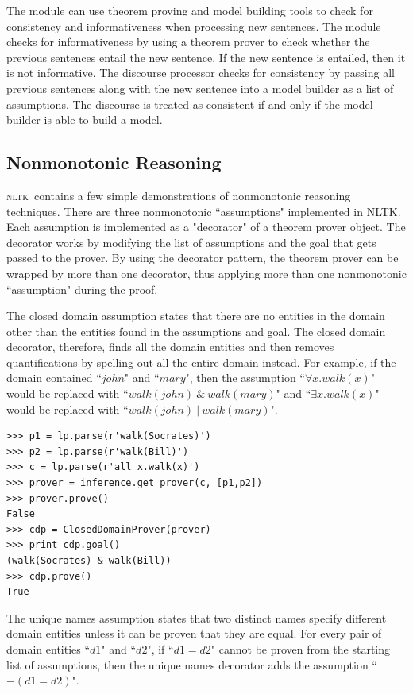 \documentclass[11pt,a4paper]{article}
\newcommand{\NLTK}{\textsc{nltk}}
\begin{document}
The module can use theorem proving and model building tools to check for consistency and informativeness when processing new sentences.  The module checks for informativeness by using a theorem prover to check whether the previous sentences entail the new sentence.  If the new sentence is entailed, then it is not informative.  The discourse processor checks for consistency by passing all previous sentences along with the new sentence into a model builder as a list of assumptions.  The discourse is treated as consistent if and only if the model builder is able to build a model.

\subsection{Nonmonotonic Reasoning}
\NLTK\ contains a few simple demonstrations of nonmonotonic reasoning techniques.  There are three nonmonotonic ``assumptions" implemented in NLTK.  Each assumption is implemented as a "decorator" of a theorem prover object.  The decorator works by modifying the list of assumptions and the goal that gets passed to the prover.  By using the decorator pattern, the theorem prover can be wrapped by more than one decorator, thus applying more than one nonmonotonic ``assumption" during the proof.

The closed domain assumption states that there are no entities in the domain other than the entities found in the assumptions and goal.  The closed domain decorator, therefore, finds all the domain entities and then removes quantifications by spelling out all the entire domain instead.  For example, if the domain contained ``$john$" and ``$mary$", then the assumption ``$\forall x.walk(x)$" would be replaced with ``$walk(john)~\&~walk(mary)$" and ``$\exists x.walk(x)$" would be replaced with ``$walk(john)~|~walk(mary)$".

\begin{verbatim}
>>> p1 = lp.parse(r'walk(Socrates)')
>>> p2 = lp.parse(r'walk(Bill)')
>>> c = lp.parse(r'all x.walk(x)')
>>> prover = inference.get_prover(c, [p1,p2])
>>> prover.prove()
False
>>> cdp = ClosedDomainProver(prover)
>>> print cdp.goal()
(walk(Socrates) & walk(Bill))
>>> cdp.prove()
True
\end{verbatim}

The unique names assumption states that two distinct names specify different domain entities unless it can be proven that they are equal.  For every pair of domain entities ``$d1$" and ``$d2$", if ``$d1 = d2$" cannot be proven from the starting list of assumptions, then the unique names decorator adds the assumption ``$-(d1 = d2)$".
\end{document}
